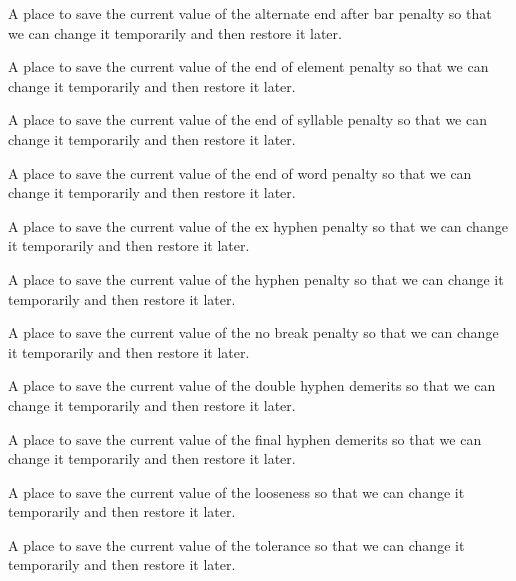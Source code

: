 A place to save the current value of the alternate end after bar penalty so that we can change it temporarily and then restore it later.

A place to save the current value of the end of element penalty so that we can change it temporarily and then restore it later.

A place to save the current value of the end of syllable penalty so that we can change it temporarily and then restore it later.

A place to save the current value of the end of word penalty so that we can change it temporarily and then restore it later.

A place to save the current value of the ex hyphen penalty so that we can change it temporarily and then restore it later.

A place to save the current value of the hyphen penalty so that we can change it temporarily and then restore it later.

A place to save the current value of the no break penalty so that we can change it temporarily and then restore it later.

A place to save the current value of the double hyphen demerits so that we can change it temporarily and then restore it later.

A place to save the current value of the final hyphen demerits so that we can change it temporarily and then restore it later.

A place to save the current value of the looseness so that we can change it temporarily and then restore it later.

A place to save the current value of the tolerance so that we can change it temporarily and then restore it later.

